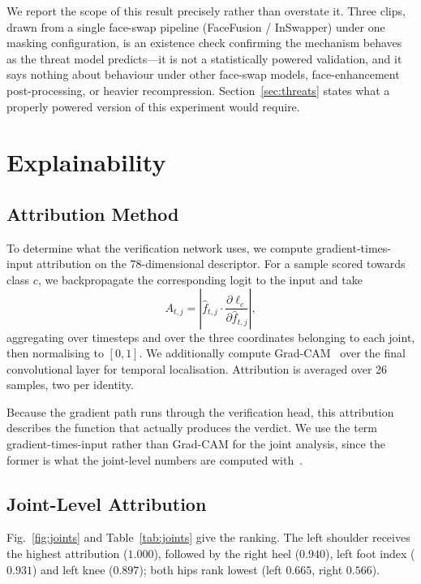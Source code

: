 \documentclass[journal]{IEEEtran}
\begin{document}
We report the scope of this result precisely rather than overstate it. Three
clips, drawn from a single face-swap pipeline (FaceFusion / InSwapper) under
one masking configuration, is an existence check confirming the mechanism
behaves as the threat model predicts---it is not a statistically powered
validation, and it says nothing about behaviour under other face-swap models,
face-enhancement post-processing, or heavier recompression.
Section~\ref{sec:threats} states what a properly powered version of this
experiment would require.

\section{Explainability}
\label{sec:explain}

\subsection{Attribution Method}

To determine what the verification network uses, we compute gradient-times-input
attribution on the 78-dimensional descriptor. For a sample scored towards class
$c$, we backpropagate the corresponding logit to the input and take
\begin{equation}
A_{t,j} = \left| \hat{f}_{t,j} \cdot
\frac{\partial \ell_c}{\partial \hat{f}_{t,j}} \right|,
\end{equation}
aggregating over timesteps and over the three coordinates belonging to each
joint, then normalising to $[0,1]$. We additionally compute
Grad-CAM~\cite{gradcam} over the final convolutional layer for temporal
localisation. Attribution is averaged over 26 samples, two per identity.

Because the gradient path runs through the verification head, this attribution
describes the function that actually produces the verdict. We use the term
gradient-times-input rather than Grad-CAM for the joint analysis, since the
former is what the joint-level numbers are computed
with~\cite{shrikumar,sundararajan}.

\subsection{Joint-Level Attribution}

Fig.~\ref{fig:joints} and Table~\ref{tab:joints} give the ranking. The left
shoulder receives the highest attribution ($1.000$), followed by the right heel
($0.940$), left foot index ($0.931$) and left knee ($0.897$); both hips rank
lowest (left $0.665$, right $0.566$).
\end{document}
